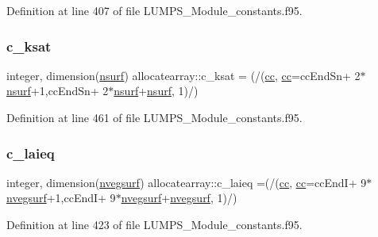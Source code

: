Definition at line 407 of file L\+U\+M\+P\+S\+\_\+\+Module\+\_\+constants.\+f95.

\mbox{\label{namespaceallocatearray_a47724ffebb2294115eade5c48938816b}} 
\subsubsection{\texorpdfstring{c\+\_\+ksat}{c\_ksat}}
{\footnotesize\ttfamily integer, dimension(\hyperlink{namespaceallocatearray_acd22f92a06f7e9a2a91426b3dc99fdb0}{nsurf}) allocatearray\+::c\+\_\+ksat = (/(\hyperlink{namespaceallocatearray_ac863c81704eb507dee10f5e10741e10c}{cc}, \hyperlink{namespaceallocatearray_ac863c81704eb507dee10f5e10741e10c}{cc}=cc\+End\+Sn+ 2$\ast$\hyperlink{namespaceallocatearray_acd22f92a06f7e9a2a91426b3dc99fdb0}{nsurf}+1,cc\+End\+Sn+ 2$\ast$\hyperlink{namespaceallocatearray_acd22f92a06f7e9a2a91426b3dc99fdb0}{nsurf}+\hyperlink{namespaceallocatearray_acd22f92a06f7e9a2a91426b3dc99fdb0}{nsurf}, 1)/)}



Definition at line 461 of file L\+U\+M\+P\+S\+\_\+\+Module\+\_\+constants.\+f95.

\mbox{\label{namespaceallocatearray_ae56916b143641c9b88a8877a6efd23d9}} 
\subsubsection{\texorpdfstring{c\+\_\+laieq}{c\_laieq}}
{\footnotesize\ttfamily integer, dimension(\hyperlink{namespaceallocatearray_abb987c3b35dd321963fd53d38f10236f}{nvegsurf}) allocatearray\+::c\+\_\+laieq =(/(\hyperlink{namespaceallocatearray_ac863c81704eb507dee10f5e10741e10c}{cc}, \hyperlink{namespaceallocatearray_ac863c81704eb507dee10f5e10741e10c}{cc}=cc\+EndI+ 9$\ast$\hyperlink{namespaceallocatearray_abb987c3b35dd321963fd53d38f10236f}{nvegsurf}+1,cc\+EndI+ 9$\ast$\hyperlink{namespaceallocatearray_abb987c3b35dd321963fd53d38f10236f}{nvegsurf}+\hyperlink{namespaceallocatearray_abb987c3b35dd321963fd53d38f10236f}{nvegsurf}, 1)/)}



Definition at line 423 of file L\+U\+M\+P\+S\+\_\+\+Module\+\_\+constants.\+f95.

